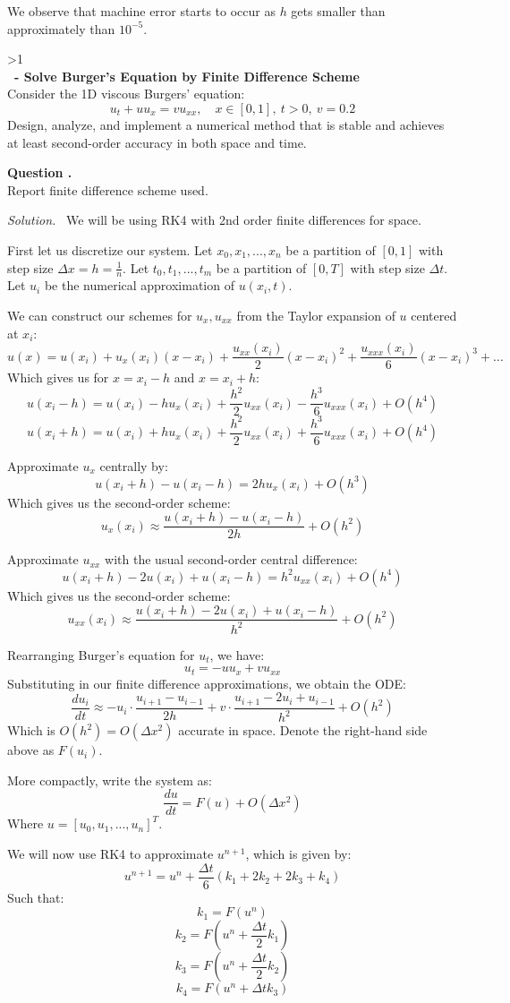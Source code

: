 \documentclass[12pt]{article}
\newcounter{question}
\newcounter{subquest}
\newcommand{\question}[1]{
    \stepcounter{question} 
    \ifnum\value{question}>1 \newpage \fi
    \vspace{1.5em}
    \textbf{\\ \Large\thequestion \ - #1}
    \vspace{.5em} 
    \setcounter{subquest}{0}\ \\}
\newcommand{\subquestion}[1][true]{
    \stepcounter{subquest} 
    \ifthenelse{\equal{#1}{true} \and \value{subquest}>1}{\newpage}{}
    \vspace{1em}
    \textbf{\large Question \thequestion.\thesubquest}
    \vspace{.5em}\ \\}
\newcommand{\solution}
    {\par\vspace{0.5em}\noindent\emph{Solution.}\ }
    {\par\vspace{1em}}
\begin{document}
We observe that machine error starts to occur as $h$ gets smaller than approximately than $10^{-5}$.


\question{Solve Burger's Equation by Finite Difference Scheme}
Consider the 1D viscous Burgers' equation:
\[u_t+uu_x=vu_{xx},\quad x\in[0,1], \ t>0, \ v=0.2\]
Design, analyze, and implement a numerical method that 
is stable and achieves at least second-order accuracy 
in both space and time.

\subquestion
Report finite difference scheme used.

\solution
We will be using RK4 with 2nd order finite differences for space.

First let us discretize our system. Let ${x_0, x_1, ..., x_n}$ be a partition of $[0,1]$ with step size $\Delta x =h=\frac{1}{n}$. Let $t_0, t_1, ..., t_m$ be a partition of $[0, T]$ with step size $\Delta t$. Let $u_i$ be the numerical approximation of $u(x_i, t)$.

We can construct our schemes for $u_x, u_{xx}$ from the Taylor expansion of $u$ centered at $x_i$:
\[u(x) = u(x_i) +u_x(x_i)(x-x_i) + \frac{u_{xx}(x_i)}{2}(x-x_i)^2 + \frac{u_{xxx}(x_i)}{6}(x-x_i)^3 + ...\]
Which gives us for $x=x_i - h$ and $x=x_i + h$:
\[u(x_i-h) = u(x_i) - hu_x(x_i) + \frac{h^2}{2}u_{xx}(x_i) - \frac{h^3}{6}u_{xxx}(x_i) + O(h^4)\]
\[u(x_i+h) = u(x_i) + hu_x(x_i) + \frac{h^2}{2}u_{xx}(x_i) + \frac{h^3}{6}u_{xxx}(x_i) + O(h^4)\]

Approximate $u_x$ centrally by:
\[u(x_i+h)-u(x_i-h) = 2hu_x(x_i) + O(h^3)\]
Which gives us the second-order scheme:
\[u_x(x_i) \approx \frac{u(x_i+h) - u(x_i - h)}{2h} + O(h^2)\]

Approximate $u_{xx}$ with the usual second-order central difference:
\[u(x_i+h) - 2u(x_i) + u(x_i - h) = h^2u_{xx}(x_i) + O(h^4)\]
Which gives us the second-order scheme:
\[u_{xx}(x_i) \approx \frac{u(x_i+h) - 2u(x_i) + u(x_i - h)}{h^2} + O(h^2)\]

Rearranging Burger's equation for $u_t$, we have:
\[u_t = -uu_x + vu_{xx}\]
Substituting in our finite difference approximations, we obtain the ODE:
\[\frac{d u_i}{dt} \approx -u_i \cdot \frac{u_{i+1}- u_{i-1}}{2h} + v \cdot \frac{u_{i+1} - 2u_i + u_{i-1}}{h^2}+O(h^2)\]
Which is $O(h^2)=O(\Delta x^2)$ accurate in space. Denote the right-hand side above as $F(u_i)$. 

More compactly, write the system as:
\[\frac{d u}{dt} = F(u) + O(\Delta x^2)\]
Where $u = [u_0, u_1, ..., u_n]^T$.

We will now use RK4 to approximate $u^{n+1}$, which is given by:
\[u^{n+1} = u^n + \frac{\Delta t}{6}(k_1 + 2k_2 + 2k_3 + k_4)\]
Such that:
\[k_1 = F(u^n)\]
\[k_2 = F\left(u^n + \frac{\Delta t}{2}k_1\right)\]
\[k_3 = F\left(u^n + \frac{\Delta t}{2}k_2\right)\]
\[k_4 = F\left(u^n + \Delta t k_3\right)\]
\end{document}
